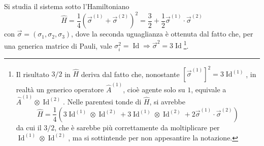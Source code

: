 \documentclass[11pt, a4paper]{scrartcl} %
\numberwithin{equation}{subsection}
\theoremstyle{style2}
\theoremstyle{style1}
\begin{document}
Si studia il sistema sotto l'Hamiltoniano
\[
\hat{H} = \frac{1}{4} \left( \vec{\sigma }^{(1)}  + \vec{\sigma }^{(2)} \right)^2= \frac{3}{2} + \frac{1}{2} \vec{\sigma }^{(1)} \cdot \vec{\sigma }^{(2)}
\] 
con $\vec{\sigma } = (\sigma _1 , \sigma_2 , \sigma _3)$, dove la seconda uguaglianza \`e ottenuta dal fatto che, per una generica matrice di Pauli, vale $\sigma _i ^2 = \operatorname{Id} \Rightarrow \vec{\sigma }^2 = 3 \operatorname{Id} $\footnote{Il risultato $3 /2$ in $\hat{H}$ deriva dal fatto che, nonostante $\left[ \vec{\sigma }^{(1)}  \right] ^2 = 3\operatorname{Id} ^{(1)} $, in realt\`a un generico operatore $\hat{A}^{(1)}$, cio\`e agente solo su $1$, equivale a $\hat{A}^{(1)} \otimes \operatorname{Id} ^{(2)} $. Nelle parentesi tonde di $\hat{H}$, si avrebbe
\[
	\hat{H}= \frac{1}{4} \left(3 \operatorname{Id} ^{(1)} \otimes \operatorname{Id} ^{(2)} + 3 \operatorname{Id} ^{(1)} \otimes \operatorname{Id} ^{(2)} + 2 \vec{\sigma }^{(1)} \cdot \vec{\sigma }^{(2)} \right) 
\] 
da cui il $3 / 2$, che \`e sarebbe pi\`u correttamente da moltiplicare per $\operatorname{Id} ^{(1)} \otimes \operatorname{Id} ^{(2)} $, ma si sottintende per non appesantire la notazione.
}.
\end{document}
